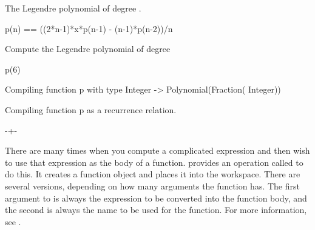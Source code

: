 \begin{xtc}
\begin{xtccomment}
The Legendre polynomial of degree .
\end{xtccomment}
\begin{spadsrc}
p(n) == ((2*n-1)*x*p(n-1) - (n-1)*p(n-2))/n
\end{spadsrc}
\end{xtc}
\begin{xtc}
\begin{xtccomment}
Compute the Legendre polynomial of degree 
\end{xtccomment}
\begin{spadsrc}
p(6)
\end{spadsrc}
\begin{MessageOutput}
   Compiling function p with type Integer -> Polynomial(Fraction(
      Integer)) 
\end{MessageOutput}
\begin{MessageOutput}
   Compiling function p as a recurrence relation.
\end{MessageOutput}
\begin{TeXOutput}
\begin{fricasmath}{9}
\TIMES {}-{\TIMES {}}+\TIMES {}-{}%
\end{fricasmath}
\end{TeXOutput}
\end{xtc}


There are many times when you compute a complicated expression
and then wish to use that expression as the body of a function.
\Language{} provides an operation called  to do
this.
It creates a function object and places it into the workspace.
There are several versions, depending on how many arguments the function
has.
The first argument to  is always the expression to be
converted into the function body, and the second is always the name to be
used for the function.
For more information, see .

